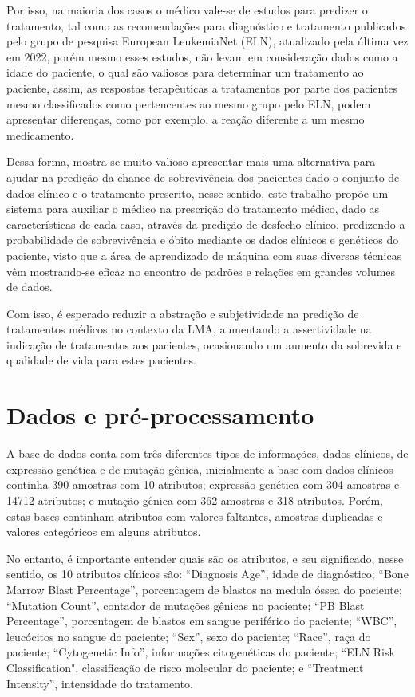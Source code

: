 \documentclass[10pt, conference, compsocconf]{IEEEtran}
\begin{document}
Por isso, na maioria dos casos o médico vale-se de estudos para predizer o tratamento, tal como as recomendações para diagnóstico e tratamento publicados pelo grupo de pesquisa European LeukemiaNet (ELN), atualizado pela última vez em 2022, porém mesmo esses estudos, não levam em consideração dados como a idade do paciente, o qual são valiosos para determinar um tratamento ao paciente, assim, as respostas terapêuticas a tratamentos por parte dos pacientes mesmo classificados como pertencentes ao mesmo grupo pelo ELN, podem apresentar diferenças, como por exemplo, a reação diferente a um mesmo medicamento.

Dessa forma, mostra-se muito valioso apresentar mais uma alternativa para ajudar na predição da chance de sobrevivência dos pacientes dado o conjunto de dados clínico e o tratamento prescrito, nesse sentido, este trabalho propõe um sistema para auxiliar o médico na prescrição do tratamento médico, dado as características de cada caso, através da predição de desfecho clínico, predizendo a probabilidade de sobrevivência e óbito mediante os dados clínicos e genéticos do paciente, visto que a área de aprendizado de máquina com suas diversas técnicas vêm mostrando-se eficaz no encontro de padrões e relações em grandes volumes de dados.

Com isso, é esperado reduzir a abstração e subjetividade na predição de tratamentos médicos no contexto da LMA, aumentando a assertividade na indicação de tratamentos aos pacientes, ocasionando um aumento da sobrevida e qualidade de vida para estes pacientes. 

\section{Dados e pré-processamento}
\label{sec:formatting}
A base de dados conta com três diferentes tipos de informações, dados clínicos, de expressão genética e de mutação gênica, inicialmente a base com dados clínicos continha 390 amostras com 10 atributos; expressão genética com 304 amostras e 14712 atributos; e mutação gênica com 362 amostras e 318 atributos. Porém, estas bases continham atributos com valores faltantes, amostras duplicadas e valores categóricos em alguns atributos.

No entanto, é importante entender quais são os atributos, e seu significado, nesse sentido, os 10 atributos clínicos são: “Diagnosis Age”, idade de diagnóstico; “Bone Marrow Blast Percentage”, porcentagem de blastos na medula óssea do paciente; “Mutation Count”, contador de mutações gênicas no paciente; “PB Blast Percentage”, porcentagem de blastos em sangue periférico do paciente; “WBC”, leucócitos no sangue do paciente; “Sex”, sexo do paciente; “Race”, raça do paciente; “Cytogenetic Info”, informações citogenéticas do paciente; “ELN Risk Classification", classificação de risco molecular do paciente; e “Treatment Intensity”, intensidade do tratamento.  
\end{document}
